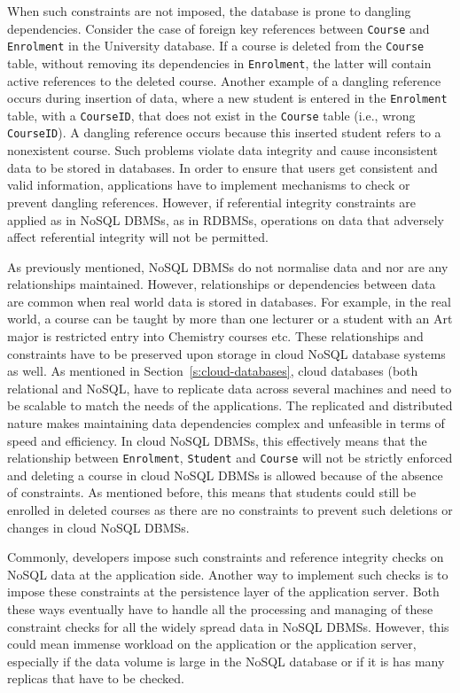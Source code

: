 When such constraints are not imposed, the database  is prone to dangling
dependencies.  Consider the case of foreign key references between
\texttt{Course} and \texttt{Enrolment} in the  University database.  If a course
is deleted from the \texttt{Course} table, without removing its dependencies in
\texttt{Enrolment},   the latter will contain active references to the deleted
course.  Another example of a dangling reference occurs during insertion of
data,   where a new student is entered in the \texttt{Enrolment} table,   with a
\texttt{CourseID},   that does not exist in the \texttt{Course} table (i.e.,  
wrong \texttt{CourseID}).  A dangling reference occurs because this inserted
student refers to a nonexistent course.
Such problems violate data integrity and cause inconsistent data to be stored in
databases.  In order to ensure that users get consistent and valid information,
applications  have to implement mechanisms to check or prevent dangling
references.  However, if referential integrity constraints are applied as in
\ac{NoSQL} \acp{DBMS}, as in  \acp{RDBMS},   operations on data that  adversely
affect referential integrity will not be permitted.

As previously mentioned,   \ac{NoSQL} \acp{DBMS} do not normalise data and nor
are any relationships maintained.  However, relationships or dependencies
between data are common when real world data is stored in databases.  For
example,   in the real world,   a course can be taught by more than one lecturer
or a student with an Art major is restricted entry into Chemistry courses etc. 
These relationships and constraints have to be preserved upon storage in cloud
\ac{NoSQL} database systems as well.  As mentioned in
Section~\ref{s:cloud-databases},   cloud databases (both relational and
\ac{NoSQL},   have to replicate data across several machines and need to be
scalable to match the needs of the applications.  The replicated and distributed
nature makes maintaining data dependencies complex and unfeasible in terms of
speed and efficiency.  In cloud \ac{NoSQL} \acp{DBMS},   this effectively means
that the relationship between \texttt{Enrolment}, \texttt{Student} and
\texttt{Course}  will not be strictly enforced and deleting a course in
cloud \ac{NoSQL} \acp{DBMS} is allowed because of the absence of constraints.  As
mentioned before,   this means that students could still be enrolled in deleted
courses as there are no constraints to prevent such deletions or changes in
cloud \ac{NoSQL} \acp{DBMS}.

Commonly,   developers impose such constraints and reference integrity checks on
\ac{NoSQL} data at the application side.  Another way to implement such checks
is to impose these constraints at the persistence layer of the application
server.
 Both these ways  eventually have to handle all the processing and managing
of these constraint checks for all the widely spread data in \ac{NoSQL}
\acp{DBMS}. However,   this could mean immense workload on the application or
the application server,   especially if the data volume is large in the \ac{NoSQL}
database or if it is has many replicas that have to be checked.


